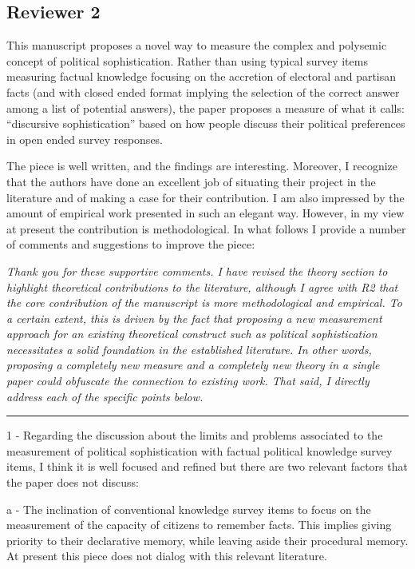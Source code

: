 

\subsection*{Reviewer 2}

This manuscript proposes a novel way to measure the complex and polysemic concept of political sophistication. Rather than using typical survey items measuring factual knowledge focusing on the accretion of electoral and partisan facts (and with closed ended format implying the selection of the correct answer among a list of potential answers), the paper proposes a measure of what it calls: ``discursive sophistication'' based on how people discuss their political preferences in open ended survey responses. 

The piece is well written, and the findings are interesting. Moreover, I recognize that the authors have done an excellent job of situating their project in the literature and of making a case for their contribution. I am also impressed by the amount of empirical work presented in such an elegant way. However, in my view at present the contribution is methodological. In what follows I provide a number of comments and suggestions to improve the piece:

\textit{Thank you for these supportive comments. I have revised the theory section to highlight theoretical contributions to the literature, although I agree with R2 that the core contribution of the manuscript is more methodological and empirical. To a certain extent, this is driven by the fact that proposing a new measurement approach for an existing theoretical construct such as political sophistication necessitates a solid foundation in the established literature. In other words, proposing a completely new measure {\normalfont and} a completely new theory in a single paper could obfuscate the connection to existing work. That said, I directly address each of the specific points below.}


\rule{\linewidth}{.01cm}

1 - Regarding the discussion about the limits and problems associated to the measurement of political sophistication with factual political knowledge survey items, I think it is well focused and refined but there are two relevant factors that the paper does not discuss: 

a - The inclination of conventional knowledge survey items to focus on the measurement of the capacity of citizens to remember facts. This implies giving priority to their declarative memory, while leaving aside their procedural memory. At present this piece does not dialog with this relevant literature.

